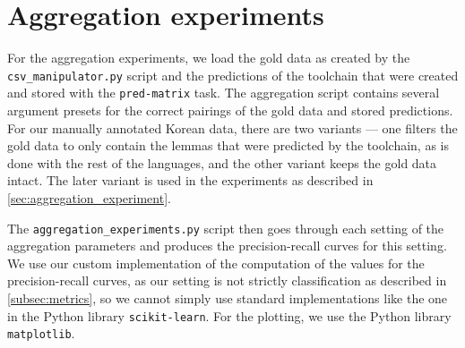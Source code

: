 \section{Aggregation experiments}

For the aggregation experiments, we load the gold data as created by the \texttt{csv\_manipulator.py} script and the predictions of the toolchain that were created and stored with the \texttt{pred-matrix} task. The aggregation script contains several argument presets for the correct pairings of the gold data and stored predictions. For our manually annotated Korean data, there are two variants --- one filters the gold data to only contain the lemmas that were predicted by the toolchain, as is done with the rest of the languages, and the other variant keeps the gold data intact. The later variant is used in the experiments as described in \cref{sec:aggregation_experiment}.

The \texttt{aggregation\_experiments.py} script then goes through each setting of the aggregation parameters and produces the precision-recall curves for this setting. We use our custom implementation of the computation of the values for the precision-recall curves, as our setting is not strictly classification as described in \cref{subsec:metrics}, so we cannot simply use standard implementations like the one in the Python library \texttt{scikit-learn}. For the plotting, we use the Python library \texttt{matplotlib}.


